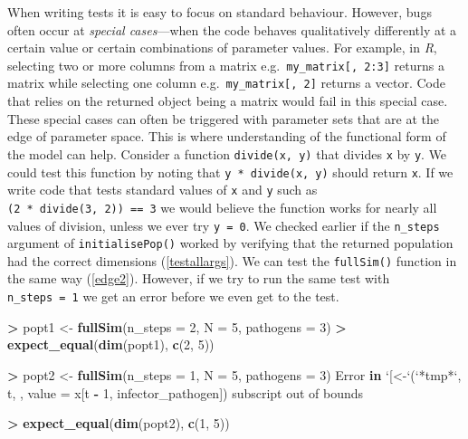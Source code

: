 \documentclass[
]{article}
\newenvironment{Shaded}{\begin{snugshade}}{\end{snugshade}}
\newcommand{\ControlFlowTok}[1]{\textcolor[rgb]{0.13,0.29,0.53}{\textbf{#1}}}
\newcommand{\DataTypeTok}[1]{\textcolor[rgb]{0.13,0.29,0.53}{#1}}
\newcommand{\DecValTok}[1]{\textcolor[rgb]{0.00,0.00,0.81}{#1}}
\newcommand{\KeywordTok}[1]{\textcolor[rgb]{0.13,0.29,0.53}{\textbf{#1}}}
\newcommand{\NormalTok}[1]{#1}
\newcommand{\OperatorTok}[1]{\textcolor[rgb]{0.81,0.36,0.00}{\textbf{#1}}}
\newcommand{\StringTok}[1]{\textcolor[rgb]{0.31,0.60,0.02}{#1}}
\begin{document}
When writing tests it is easy to focus on standard behaviour.
However, bugs often occur at \emph{special cases}---when the code behaves qualitatively differently at a certain value or certain combinations of parameter values.
For example, in \emph{R}, selecting two or more columns from a matrix e.g.~\texttt{my\_matrix{[},\ 2:3{]}} returns a matrix while selecting one column e.g.~\texttt{my\_matrix{[},\ 2{]}} returns a vector.
Code that relies on the returned object being a matrix would fail in this special case.
These special cases can often be triggered with parameter sets that are at the edge of parameter space.
This is where understanding of the functional form of the model can help.
Consider a function \texttt{divide(x,\ y)} that divides \texttt{x} by \texttt{y}.
We could test this function by noting that \texttt{y\ *\ divide(x,\ y)} should return \texttt{x}.
If we write code that tests standard values of \texttt{x} and \texttt{y} such as \texttt{(2\ *\ divide(3,\ 2))\ ==\ 3} we would believe the function works for nearly all values of division, unless we ever try \texttt{y\ =\ 0}.
\newline
\newline
We checked earlier if the \texttt{n\_steps} argument of \texttt{initialisePop()} worked by verifying that the returned population had the correct dimensions (\ref{testallargs}).
We can test the \texttt{fullSim()} function in the same way (\ref{edge2}).
However, if we try to run the same test with \texttt{n\_steps\ =\ 1} we get an error before we even get to the test.
\newline
{}\label{edge2}

\begin{Shaded}
\begin{Highlighting}[]
\OperatorTok{>}\StringTok{ }\NormalTok{popt1 <-}\StringTok{ }\KeywordTok{fullSim}\NormalTok{(}\DataTypeTok{n_steps =} \DecValTok{2}\NormalTok{, }\DataTypeTok{N =} \DecValTok{5}\NormalTok{, }\DataTypeTok{pathogens =} \DecValTok{3}\NormalTok{) }
\OperatorTok{>}\StringTok{ }\KeywordTok{expect_equal}\NormalTok{(}\KeywordTok{dim}\NormalTok{(popt1), }\KeywordTok{c}\NormalTok{(}\DecValTok{2}\NormalTok{, }\DecValTok{5}\NormalTok{))}

\OperatorTok{>}\StringTok{ }\NormalTok{popt2 <-}\StringTok{ }\KeywordTok{fullSim}\NormalTok{(}\DataTypeTok{n_steps =} \DecValTok{1}\NormalTok{, }\DataTypeTok{N =} \DecValTok{5}\NormalTok{, }\DataTypeTok{pathogens =} \DecValTok{3}\NormalTok{)}
\NormalTok{Error }\ControlFlowTok{in} \StringTok{`}\DataTypeTok{[<-}\StringTok{`}\NormalTok{(}\StringTok{`}\DataTypeTok{*tmp*}\StringTok{`}\NormalTok{, t, , }\DataTypeTok{value =}\NormalTok{ x[t }\OperatorTok{-}\StringTok{ }\DecValTok{1}\NormalTok{, infector_pathogen]) }
\NormalTok{  subscript out of bounds}
  
\OperatorTok{>}\StringTok{ }\KeywordTok{expect_equal}\NormalTok{(}\KeywordTok{dim}\NormalTok{(popt2), }\KeywordTok{c}\NormalTok{(}\DecValTok{1}\NormalTok{, }\DecValTok{5}\NormalTok{))}
\end{Highlighting}
\end{Shaded}
\end{document}
